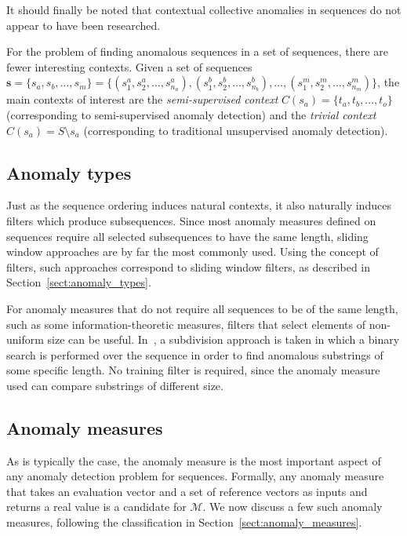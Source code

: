 It should finally be noted that contextual collective anomalies in sequences do not appear to have been researched.

For the problem of finding anomalous sequences in a set of sequences, there are fewer interesting contexts. Given a set of sequences $\mathbf{s} = \{s_a, s_b, \dots, s_m\} = \{(s^a_1, s^a_2, \ldots, s^a_{n_a}), (s^b_1, s^b_2, \ldots, s^b_{n_b}), \ldots, (s^m_1, s^m_2, \ldots, s^m_{n_m}) \}$, the main contexts of interest are the \emph{semi-supervised context} $C(s_a) = \{t_a, t_b, \dots, t_o\}$ (corresponding to semi-supervised anomaly detection) and the \emph{trivial context} $C(s_a) = S \setminus s_a$ (corresponding to traditional unsupervised anomaly detection).

\subsection{Anomaly types}

Just as the sequence ordering induces natural contexts, it also naturally induces filters which produce subsequences. Since most anomaly measures defined on sequences require all selected subsequences to have the same length, sliding window approaches are by far the most commonly used. Using the concept of filters, such approaches correspond to sliding window filters, as described in Section~\ref{sect:anomaly_types}.

For anomaly measures that do not require all sequences to be of the same length, such as some information-theoretic measures, filters that select elements of non-uniform size can be useful. In~\cite{TODO}, a subdivision approach is taken in which a binary search is performed over the sequence in order to find anomalous substrings of some specific length. No training filter is required, since the anomaly measure used can compare substrings of different size.

\subsection{Anomaly measures}

As is typically the case, the anomaly measure is the most important aspect of any anomaly detection problem for sequences. Formally, any anomaly measure that takes an evaluation vector and a set of reference vectors as inputs and returns a real value is a candidate for $\mathcal{M}$. We now discuss a few such anomaly measures, following the classification in Section~\ref{sect:anomaly_measures}.

